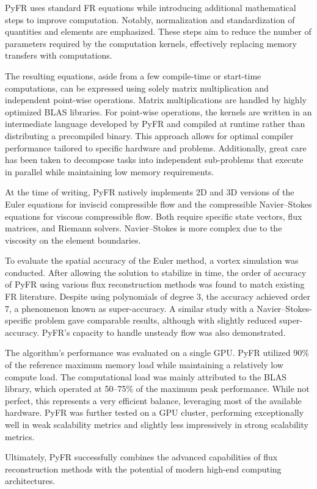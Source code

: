 \documentclass[12pt]{article}
\begin{document}
PyFR uses standard FR equations while introducing additional mathematical steps to improve computation. Notably, normalization and standardization of quantities and elements are emphasized. These steps aim to reduce the number of parameters required by the computation kernels, effectively replacing memory transfers with computations.

The resulting equations, aside from a few compile-time or start-time computations, can be expressed using solely matrix multiplication and independent point-wise operations. Matrix multiplications are handled by highly optimized BLAS libraries. For point-wise operations, the kernels are written in an intermediate language developed by PyFR and compiled at runtime rather than distributing a precompiled binary. This approach allows for optimal compiler performance tailored to specific hardware and problems. Additionally, great care has been taken to decompose tasks into independent sub-problems that execute in parallel while maintaining low memory requirements.

At the time of writing, PyFR natively implements 2D and 3D versions of the Euler equations for inviscid compressible flow and the compressible Navier–Stokes equations for viscous compressible flow. Both require specific state vectors, flux matrices, and Riemann solvers. Navier–Stokes is more complex due to the viscosity on the element boundaries.

To evaluate the spatial accuracy of the Euler method, a vortex simulation was conducted. After allowing the solution to stabilize in time, the order of accuracy of PyFR using various flux reconstruction methods was found to match existing FR literature. Despite using polynomials of degree 3, the accuracy achieved order 7, a phenomenon known as super-accuracy. A similar study with a Navier–Stokes-specific problem gave comparable results, although with slightly reduced super-accuracy. PyFR's capacity to handle unsteady flow was also demonstrated.

The algorithm's performance was evaluated on a single GPU. PyFR utilized 90\% of the reference maximum memory load while maintaining a relatively low compute load. The computational load was mainly attributed to the BLAS library, which operated at 50–75\% of the maximum peak performance. While not perfect, this represents a very efficient balance, leveraging most of the available hardware. PyFR was further tested on a GPU cluster, performing exceptionally well in weak scalability metrics and slightly less impressively in strong scalability metrics.

Ultimately, PyFR successfully combines the advanced capabilities of flux reconstruction methods with the potential of modern high-end computing architectures.
\end{document}
